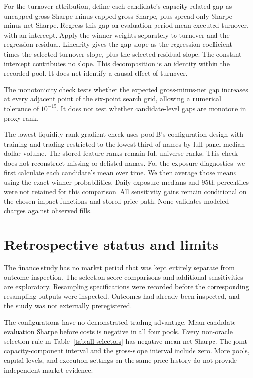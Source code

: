 \documentclass[10pt,letterpaper]{article}
\begin{document}
For the turnover attribution, define each candidate's capacity-related gap as uncapped gross Sharpe minus capped gross Sharpe, plus spread-only Sharpe minus net Sharpe. Regress this gap on evaluation-period mean executed turnover, with an intercept. Apply the winner weights separately to turnover and the regression residual. Linearity gives the gap slope as the regression coefficient times the selected-turnover slope, plus the selected-residual slope. The constant intercept contributes no slope. This decomposition is an identity within the recorded pool. It does not identify a causal effect of turnover.

The monotonicity check tests whether the expected gross-minus-net gap increases at every adjacent point of the six-point search grid, allowing a numerical tolerance of $10^{-15}$. It does not test whether candidate-level gaps are monotone in proxy rank.

The lowest-liquidity rank-gradient check uses pool B's configuration design with training and trading restricted to the lowest third of names by full-panel median dollar volume. The stored feature ranks remain full-universe ranks. This check does not reconstruct missing or delisted names. For the exposure diagnostics, we first calculate each candidate's mean over time. We then average those means using the exact winner probabilities. Daily exposure medians and 95th percentiles were not retained for this comparison. All sensitivity gains remain conditional on the chosen impact functions and stored price path. None validates modeled charges against observed fills.

\section{Retrospective status and limits}\label{sec:status}
The finance study has no market period that was kept entirely separate from outcome inspection. The selection-score comparisons and additional sensitivities are exploratory. Resampling specifications were recorded before the corresponding resampling outputs were inspected. Outcomes had already been inspected, and the study was not externally preregistered.

The configurations have no demonstrated trading advantage. Mean candidate evaluation Sharpe before costs is negative in all four pools. Every non-oracle selection rule in Table~\ref{tab:all-selectors} has negative mean net Sharpe. The joint capacity-component interval and the gross-slope interval include zero. More pools, capital levels, and execution settings on the same price history do not provide independent market evidence.
\end{document}
